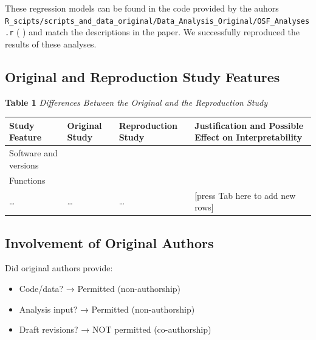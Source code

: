 \documentclass[
  letterpaper,
  DIV=11,
  numbers=noendperiod]{scrartcl}
\begin{document}
These regression models can be found in the code provided by the auhors
\texttt{R\_scipts/scripts\_and\_data\_original/Data\_Analysis\_Original/OSF\_Analyses.r}
( ) and match the descriptions in the paper. We successfully reproduced
the results of these analyses.

\subsection{Original and Reproduction Study
Features}\label{original-and-reproduction-study-features}

\textbf{Table 1} \emph{Differences Between the Original and the
Reproduction Study}

\begin{longtable}[]{@{}
  >{\raggedright\arraybackslash}p{}
  >{\raggedright\arraybackslash}p{}
  >{\raggedright\arraybackslash}p{}
  >{\raggedright\arraybackslash}p{}@{}}
\toprule\noalign{}
\begin{minipage}[b]{\linewidth}\raggedright
Study Feature
\end{minipage} & \begin{minipage}[b]{\linewidth}\raggedright
Original Study
\end{minipage} & \begin{minipage}[b]{\linewidth}\raggedright
Reproduction Study
\end{minipage} & \begin{minipage}[b]{\linewidth}\raggedright
Justification and Possible Effect on Interpretability
\end{minipage} \\
\midrule\noalign{}
\endhead
\bottomrule\noalign{}
\endlastfoot
Software and versions & & & \\
Functions & & & \\
\ldots{} & \ldots{} & \ldots{} & {[}press Tab here to add new rows{]} \\
\end{longtable}

\subsection{Involvement of Original
Authors}\label{involvement-of-original-authors}

Did original authors provide:

\begin{itemize}
\item
  Code/data? → Permitted (non-authorship)~
\item
  Analysis input? → Permitted (non-authorship)~
\item
  Draft revisions? → NOT permitted (co-authorship)
\end{itemize}
\end{document}
